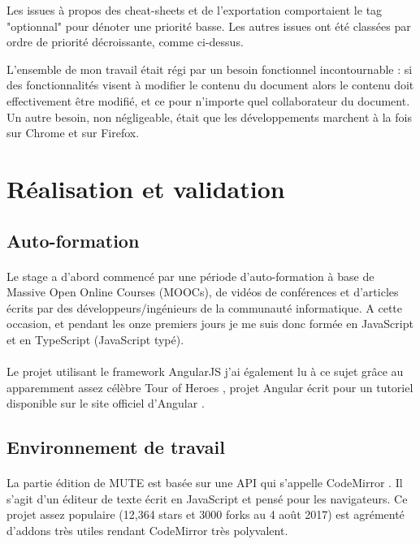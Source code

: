 \documentclass[12pt]{article}
\begin{document}
Les issues à propos des cheat-sheets et de l'exportation comportaient le tag "optionnal" pour dénoter une priorité basse. Les autres issues ont été classées par ordre de priorité décroissante, comme ci-dessus.

L'ensemble de mon travail était régi par un besoin fonctionnel incontournable : si des fonctionnalités visent à modifier le contenu du document alors le contenu doit effectivement être modifié, et ce pour n'importe quel collaborateur du document. Un autre besoin, non négligeable, était que les développements marchent à la fois sur Chrome et sur Firefox.

\newpage
\section{Réalisation et validation}
\subsection{Auto-formation}
\paragraph{}
Le stage a d'abord commencé par une période d'auto-formation à base de Massive Open Online Courses (MOOCs), de vidéos de conférences et d'articles écrits par des développeurs/ingénieurs de la communauté informatique. A cette occasion, et pendant les onze premiers jours je me suis donc formée en JavaScript et en TypeScript (JavaScript typé).
\paragraph{}
Le projet utilisant le framework AngularJS j'ai également lu à ce sujet grâce au apparemment assez célèbre Tour of Heroes \cite{tour}, projet Angular écrit pour un tutoriel disponible sur le site officiel d'Angular \cite{angular}.

\subsection{Environnement de travail}
\paragraph{}
La partie édition de MUTE est basée sur une API qui s'appelle CodeMirror \cite{codemirror}. Il s'agit d'un éditeur de texte écrit en JavaScript et pensé pour les navigateurs. Ce projet assez populaire (12,364 stars et 3000 forks au 4 août 2017) est agrémenté d'addons très utiles rendant CodeMirror très polyvalent.
\end{document}
